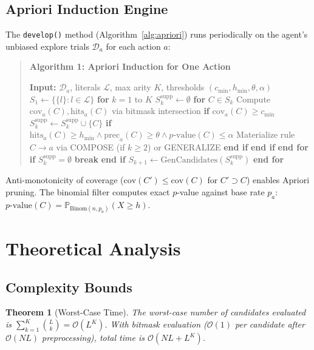\documentclass[11pt]{article}
\newcommand{\Prob}{\mathbb{P}}
\newcommand{\Binom}{\mathrm{Binom}}
\newcommand{\Oh}{\mathcal{O}}
\newcommand{\calD}{\mathcal{D}}
\newcommand{\calL}{\mathcal{L}}
\newtheorem{theorem}{Theorem}
\begin{document}
\subsection{Apriori Induction Engine}
The \texttt{develop()} method (Algorithm~\ref{alg:apriori}) runs periodically on the agent's unbiased explore trials $\calD_a$ for each action $a$:

\begin{quote}
\textbf{Algorithm 1: Apriori Induction for One Action}


\textbf{Input:} $\calD_a$, literals $\calL$, max arity $K$, thresholds $(c_{\min}, h_{\min}, \theta, \alpha)$
$S_1 \gets \{\{l\} : l \in \calL\}$
\textbf{for} $k = 1$ to $K$
    $S_k^{\text{supp}} \gets \emptyset$
    \textbf{for} $C \in S_k$
        Compute $\mathrm{cov}_a(C), \mathrm{hits}_a(C)$ via bitmask intersection
        \textbf{if} $\mathrm{cov}_a(C) \geq c_{\min}$
            $S_k^{\text{supp}} \gets S_k^{\text{supp}} \cup \{C\}$
            \textbf{if} $\mathrm{hits}_a(C) \geq h_{\min} \land \mathrm{prec}_a(C) \geq \theta \land p\text{-value}(C) \leq \alpha$
                Materialize rule $C \to a$ via COMPOSE (if $k \geq 2$) or GENERALIZE
            \textbf{end if}
        \textbf{end if}
    \textbf{end for}
    \textbf{if} $S_k^{\text{supp}} = \emptyset$ \textbf{break} \textbf{end if}
    $S_{k+1} \gets \mathrm{GenCandidates}(S_k^{\text{supp}})$
\textbf{end for}

\end{quote}

Anti-monotonicity of coverage ($\mathrm{cov}(C') \leq \mathrm{cov}(C)$ for $C' \supset C$) enables Apriori pruning. The binomial filter computes exact $p$-value against base rate $p_a$: 
$p\text{-value}(C) = \Prob_{\Binom(n, p_a)}(X \geq h)$.

\section{Theoretical Analysis}
\label{sec:theory}

\subsection{Complexity Bounds}

\begin{theorem}[Worst-Case Time]
The worst-case number of candidates evaluated is $\sum_{k=1}^K \binom{L}{k} = \Oh(L^K)$. With bitmask evaluation ($\Oh(1)$ per candidate after $\Oh(N L)$ preprocessing), total time is $\Oh(N L + L^K)$.
\end{theorem}
\end{document}
